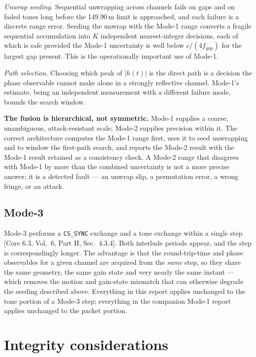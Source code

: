 \documentclass[11pt,a4paper]{article}
\newcommand{\code}[1]{\texttt{\small #1}}
\newcommand{\core}[1]{\textcolor{rulegrey}{\small[Core 6.3, #1]}}
\begin{document}
\emph{Unwrap seeding.} Sequential unwrapping across channels fails on gaps and on faded tones long
before the 149.90\,m limit is approached, and each failure is a discrete range error. Seeding the
unwrap with the Mode-1 range converts a fragile sequential accumulation into $K$ independent
nearest-integer decisions, each of which is safe provided the Mode-1 uncertainty is well below
$c/(4 f_{gap})$ for the largest gap present. This is the operationally important use of Mode-1.

\emph{Path selection.} Choosing which peak of $|h(t)|$ is the direct path is a decision the phase
observable cannot make alone in a strongly reflective channel. Mode-1's estimate, being an
independent measurement with a different failure mode, bounds the search window.

\begin{callout}
\textbf{The fusion is hierarchical, not symmetric.} Mode-1 supplies a coarse, unambiguous,
attack-resistant scale; Mode-2 supplies precision within it. The correct architecture computes the
Mode-1 range first, uses it to seed unwrapping and to window the first-path search, and reports the
Mode-2 result with the Mode-1 result retained as a consistency check. A Mode-2 range that disagrees
with Mode-1 by more than the combined uncertainty is not a more precise answer; it is a detected
fault --- an unwrap slip, a permutation error, a wrong fringe, or an attack.
\end{callout}

\subsection{Mode-3}

Mode-3 performs a \code{CS\_SYNC} exchange and a tone exchange within a single step
\core{Vol.\ 6, Part H, Sec.\ 4.3.4}. Both interlude periods appear, and the step is correspondingly
longer. The advantage is that the round-trip-time and phase observables for a given channel are
acquired from the \emph{same} step, so they share the same geometry, the same gain state and very
nearly the same instant --- which removes the motion and gain-state mismatch that can otherwise
degrade the seeding described above. Everything in this report applies unchanged to the tone portion
of a Mode-3 step; everything in the companion Mode-1 report applies unchanged to the packet portion.

\section{Integrity considerations}
\label{sec:security}
\end{document}
